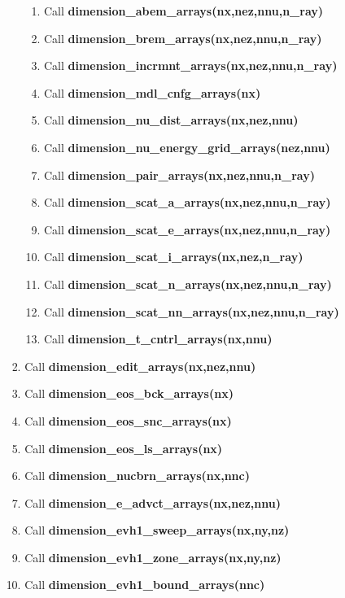 \documentclass[11pt,doublespace]{article}
\begin{document}
\begin{itemize}
\begin{enumerate}
\begin{enumerate}
\begin{enumerate}
\begin{enumerate}
  \item Call {\bf dimension\_abem\_arrays(nx,nez,nnu,n\_ray)}
  \item Call {\bf dimension\_brem\_arrays(nx,nez,nnu,n\_ray)}
  \item Call {\bf dimension\_incrmnt\_arrays(nx,nez,nnu,n\_ray)}
  \item Call {\bf dimension\_mdl\_cnfg\_arrays(nx)}
  \item Call {\bf dimension\_nu\_dist\_arrays(nx,nez,nnu)}
  \item Call {\bf dimension\_nu\_energy\_grid\_arrays(nez,nnu)}
  \item Call {\bf dimension\_pair\_arrays(nx,nez,nnu,n\_ray)}
  \item Call {\bf dimension\_scat\_a\_arrays(nx,nez,nnu,n\_ray)}
  \item Call {\bf dimension\_scat\_e\_arrays(nx,nez,nnu,n\_ray)}
  \item Call {\bf dimension\_scat\_i\_arrays(nx,nez,n\_ray)}
  \item Call {\bf dimension\_scat\_n\_arrays(nx,nez,nnu,n\_ray)}
  \item Call {\bf dimension\_scat\_nn\_arrays(nx,nez,nnu,n\_ray)}
  \item Call {\bf dimension\_t\_cntrl\_arrays(nx,nnu)}
\end{enumerate}
  \item Call {\bf dimension\_edit\_arrays(nx,nez,nnu)}
  \item Call {\bf dimension\_eos\_bck\_arrays(nx)}
  \item Call {\bf dimension\_eos\_snc\_arrays(nx)}
  \item Call {\bf dimension\_eos\_ls\_arrays(nx)}
  \item Call {\bf dimension\_nucbrn\_arrays(nx,nnc)}
  \item Call {\bf dimension\_e\_advct\_arrays(nx,nez,nnu)}
  \item Call {\bf dimension\_evh1\_sweep\_arrays(nx,ny,nz)}
  \item Call {\bf dimension\_evh1\_zone\_arrays(nx,ny,nz)}
  \item Call {\bf dimension\_evh1\_bound\_arrays(nnc)}
\end{enumerate}


\end{enumerate}
\end{enumerate}
\end{itemize}
\end{document}
